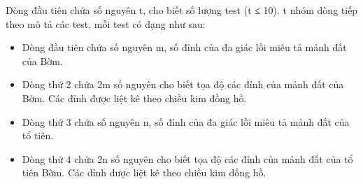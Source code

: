 Dòng đầu tiên chứa số nguyên t, cho biết số lượng test (t ≤ 10). t nhóm dòng tiếp theo mô tả các test, mỗi test có dạng như sau:  
\begin{itemize}
	\item     Dòng đầu tiên chứa số nguyên m, số đỉnh của đa giác lồi miêu tả mảnh đất của Bờm.   
	\item     Dòng thứ 2 chứa 2m số nguyên cho biết tọa độ các đỉnh của mảnh đất của Bờm. Các đỉnh được liệt kê theo chiều kim đồng hồ.   
	\item     Dòng thứ 3 chứa số nguyên n, số đỉnh của đa giác lồi miêu tả mảnh đất của tổ tiên.   
	\item     Dòng thứ 4 chứa 2n số nguyên cho biết tọa độ các đỉnh của mảnh đất của tổ tiên Bờm. Các đỉnh được liệt kê theo chiều kim đồng hồ.   
\end{itemize}